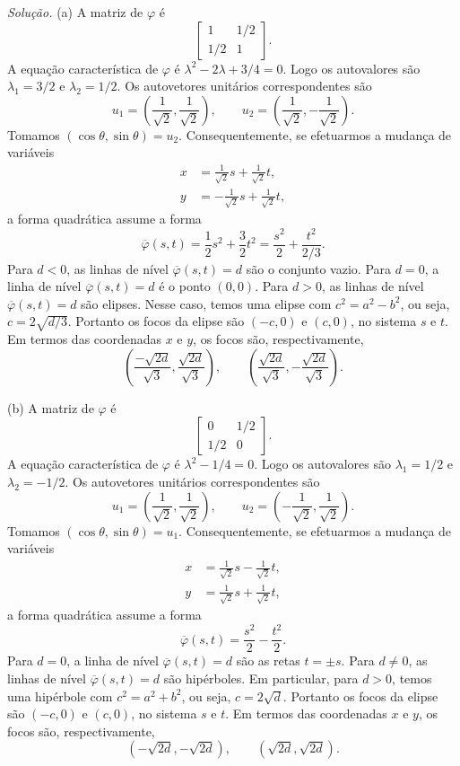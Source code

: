 \documentclass[a4paper,11pt]{article}
\begin{document}
\vspace{\baselineskip}

\emph{Solução.}
(a)
A matriz de $\varphi$ é
\[
  \begin{bmatrix}
    1 & 1/2 \\
    1/2 & 1
  \end{bmatrix}.
\]
A equação característica de $\varphi$ é $\lambda^2 - 2\lambda + 3/4 = 0$.
Logo os autovalores são $\lambda_1 = 3/2$ e $\lambda_2 = 1/2$.
Os autovetores unitários correspondentes são
\[
  u_1 = \left( \frac{1}{\sqrt{2}}, \frac{1}{\sqrt{2}} \right), \qquad u_2 = \left( \frac{1}{\sqrt{2}}, -\frac{1}{\sqrt{2}} \right).
\]
Tomamos $(\cos \theta, \sin \theta) = u_2$.
Consequentemente, se efetuarmos a mudança de variáveis
\begin{align*}
  x & = \frac{1}{\sqrt{2}} s + \frac{1}{\sqrt{2}} t, \\
  y & = -\frac{1}{\sqrt{2}} s + \frac{1}{\sqrt{2}} t,
\end{align*}
a forma quadrática assume a forma
\[
  \overline{\varphi}(s,t) = \frac{1}{2} s^2 + \frac{3}{2} t^2 = \frac{s^2}{2} + \frac{t^2}{2/3}.
\]
Para $d < 0$, as linhas de nível $\overline{\varphi}(s,t) = d$ são o conjunto vazio.
Para $d = 0$, a linha de nível $\overline{\varphi}(s,t) = d$ é o ponto $(0,0)$.
Para $d > 0$, as linhas de nível $\overline{\varphi}(s,t) = d$ são elipses.
Nesse caso, temos uma elipse com $c^2 = a^2 - b^2$, ou seja, $c = 2 \sqrt{d/3}$.
Portanto os focos da elipse são $(-c,0)$ e $(c,0)$, no sistema $s$ e $t$.
Em termos das coordenadas $x$ e $y$, os focos são, respectivamente,
\[
  \left( \frac{-\sqrt{2d}}{\sqrt{3}}, \frac{\sqrt{2d}}{\sqrt{3}} \right), \qquad \left( \frac{\sqrt{2d}}{\sqrt{3}}, -\frac{\sqrt{2d}}{\sqrt{3}} \right).
\]

(b)
A matriz de $\varphi$ é
\[
  \begin{bmatrix}
    0 & 1/2 \\
    1/2 & 0
  \end{bmatrix}.
\]
A equação característica de $\varphi$ é $\lambda^2 - 1/4 = 0$.
Logo os autovalores são $\lambda_1 = 1/2$ e $\lambda_2 = -1/2$.
Os autovetores unitários correspondentes são
\[
  u_1 = \left( \frac{1}{\sqrt{2}}, \frac{1}{\sqrt{2}} \right), \qquad u_2 = \left( -\frac{1}{\sqrt{2}}, \frac{1}{\sqrt{2}} \right).
\]
Tomamos $(\cos \theta, \sin \theta) = u_1$.
Consequentemente, se efetuarmos a mudança de variáveis
\begin{align*}
  x & = \frac{1}{\sqrt{2}} s - \frac{1}{\sqrt{2}} t, \\
  y & = \frac{1}{\sqrt{2}} s + \frac{1}{\sqrt{2}} t,
\end{align*}
a forma quadrática assume a forma
\[
  \overline{\varphi}(s,t) = \frac{s^2}{2} - \frac{t^2}{2}.
\]
Para $d = 0$, a linha de nível $\overline{\varphi}(s,t) = d$ são as retas $t = \pm s$.
Para $d \neq 0$, as linhas de nível $\overline{\varphi}(s,t) = d$ são hipérboles.
Em particular, para $d > 0$, temos uma hipérbole com $c^2 = a^2 + b^2$, ou seja, $c = 2 \sqrt{d}$.
Portanto os focos da elipse são $(-c,0)$ e $(c,0)$, no sistema $s$ e $t$.
Em termos das coordenadas $x$ e $y$, os focos são, respectivamente,
\[
  ( -\sqrt{2d}, -\sqrt{2d}), \qquad ( \sqrt{2d}, \sqrt{2d} ).
\]
\end{document}
